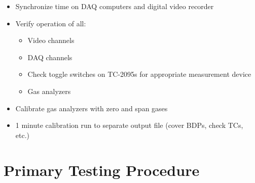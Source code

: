 \documentclass[11pt,oneside]{book}
\begin{document}
\begin{itemize}
\item Synchronize time on DAQ computers and digital video recorder

\item Verify operation of all:
    \begin{itemize}
    \item Video channels
    \item DAQ channels
    \item Check toggle switches on TC-2095s for appropriate measurement device
    \item Gas analyzers
    \end{itemize}

\item Calibrate gas analyzers with zero and span gases

\item 1 minute calibration run to separate output file (cover BDPs, check TCs, etc.)

\end{itemize}

\section{Primary Testing Procedure}
\end{document}
